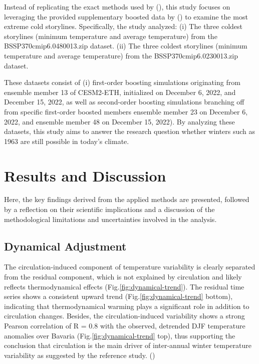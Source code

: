 \documentclass[
]{krantz}
\begin{document}
Instead of replicating the exact methods used by (\citet{sippel2024}), this study focuses on leveraging the provided supplementary boosted data by (\citet{sippel2024}) to examine the most extreme cold storylines. Specifically, the study analyzed:
(i) The three coldest storylines (minimum temperature and average temperature) from the BSSP370cmip6.0480013.zip dataset.
(ii) The three coldest storylines (minimum temperature and average temperature) from the BSSP370cmip6.0230013.zip dataset.

These datasets consist of (i) first-order boosting simulations originating from ensemble member 13 of CESM2-ETH, initialized on December 6, 2022, and December 15, 2022, as well as second-order boosting simulations branching off from specific first-order boosted members ensemble member 23 on December 6, 2022, and ensemble member 48 on December 15, 2022). By analyzing these datasets, this study aims to answer the research question whether winters such as 1963 are still possible in today's climate.

\section{Results and Discussion}\label{results-and-discussion}

Here, the key findings derived from the applied methods are presented, followed by a reflection on their scientific implications and a discussion of the methodological limitations and uncertainties involved in the analysis.

\subsection{Dynamical Adjustment}\label{dynamical-adjustment}

The circulation-induced component of temperature variability is clearly separated from the residual component, which is not explained by circulation and likely reflects thermodynamical effects (Fig.\ref{fig:dynamical-trend}). The residual time series shows a consistent upward trend (Fig.\ref{fig:dynamical-trend} bottom), indicating that thermodynamical warming plays a significant role in addition to circulation changes. Besides, the circulation-induced variability shows a strong Pearson correlation of R = 0.8 with the observed, detrended DJF temperature anomalies over Bavaria (Fig.\ref{fig:dynamical-trend} top), thus supporting the conclusion that circulation is the main driver of inter-annual winter temperature variability as suggested by the reference study. (\citet{sippel2024})
\end{document}
